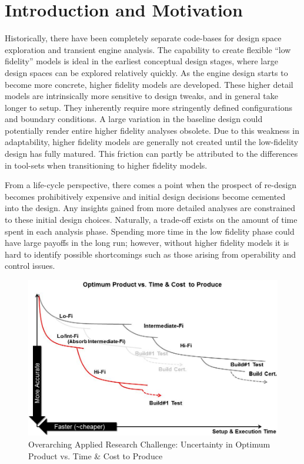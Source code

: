\documentclass[heading.tex]{subfiles}
\begin{document}

\section{Introduction and Motivation}
Historically, there have been completely separate code-bases for design space exploration and
transient engine analysis. The capability to create flexible ``low fidelity'' models is ideal in
the earliest  conceptual design stages, where large design spaces can be explored relatively
quickly. As the engine design starts to become more concrete, higher fidelity models are
developed. These higher detail models are intrinsically more sensitive to design tweaks, and in
general take longer to setup. They inherently require more stringently defined configurations
and boundary conditions. A large variation in the baseline design could
potentially render entire higher fidelity analyses obsolete. Due to this weakness in adaptability,
higher fidelity models are generally not created until the low-fidelity design has fully matured.
This friction can partly be attributed to the differences in tool-sets when transitioning to higher
fidelity models. 

	From a life-cycle perspective, there comes a point when the prospect of re-design becomes
prohibitively expensive and initial design decisions become cemented into the design. Any insights
gained from more detailed analyses are constrained to these initial design choices. Naturally, a
trade-off exists on the amount of time spent in each analysis phase. Spending more time in the low
fidelity phase could have large payoffs in the long run; however, without higher fidelity models
it is hard to identify possible shortcomings such as those arising from operability and control
issues.

\begin{figure}[H]
\centering
\includegraphics[width=1.0\textwidth]{images/optimum_product_vs_time}
\caption{Overarching Applied Research Challenge: Uncertainty in Optimum Product vs. Time \& Cost to Produce}
\label{f:product_vs_time}
\end{figure}
\end{document}
